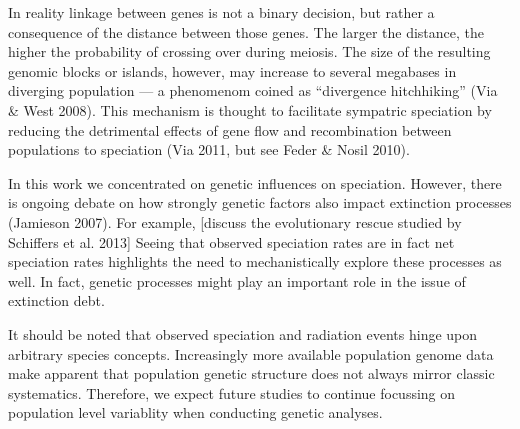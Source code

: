 \documentclass[a4paper]{scrartcl}
\begin{document}
In reality linkage between genes is not a binary decision, but rather a consequence of the distance between those genes.
The larger the distance, the higher the probability of crossing over during meiosis.
The size of the resulting genomic blocks or islands, however, may increase to several megabases in diverging population ---
a phenomenom coined as ``divergence hitchhiking'' (Via \& West 2008). %
This mechanism is thought to facilitate sympatric speciation by reducing the detrimental effects of gene flow and
recombination between populations to speciation (Via 2011, but see Feder \& Nosil 2010).

In this work we concentrated on genetic influences on speciation.
However, there is ongoing debate on how strongly genetic factors also impact extinction processes (Jamieson 2007).
For example, [discuss the evolutionary rescue studied by Schiffers et al. 2013]
Seeing that observed speciation rates are in fact net speciation rates highlights the need to mechanistically explore
these processes as well.
In fact, genetic processes might play an important role in the issue of extinction debt. %

It should be noted that observed speciation and radiation events hinge upon arbitrary species concepts.
Increasingly more available population genome data make apparent that population genetic structure does not
always mirror classic systematics.
Therefore, we expect future studies to continue focussing on population level variablity when conducting genetic analyses.
\printbibliography
\end{document}
